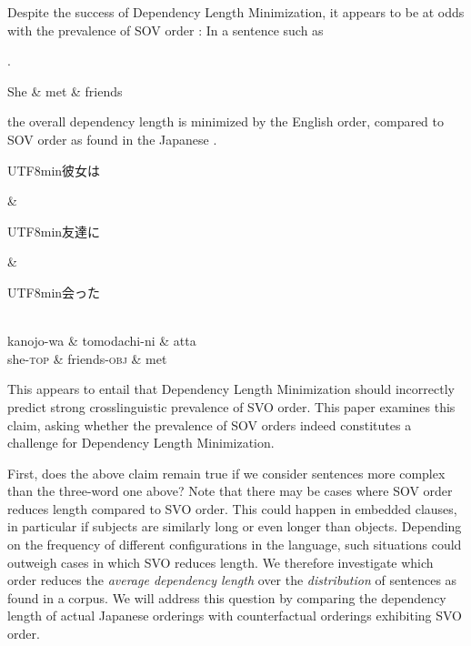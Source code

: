 \documentclass[11pt,a4paper]{article}
\newcommand{\japanese}[1]{\begin{CJK}{UTF8}{min}#1\end{CJK}}
\begin{document}
Despite the success of Dependency Length Minimization, it appears to be at odds with the prevalence of SOV order \citep{ferrer-i-cancho-placement-2017}: In a sentence such as

\ex.
\begin{dependency}[theme = simple]
   \begin{deptext}[column sep=1em]
          She \& met \& friends  \\
   \end{deptext}
\end{dependency}

the overall dependency length is minimized by the English order, compared to SOV order as found in the Japanese
\ex.
\begin{dependency}[theme = simple]
   \begin{deptext}[column sep=1em]
          \japanese{彼女は} \& \japanese{友達に} \& \japanese{会った}  \\
          kanojo-wa \& tomodachi-ni \& atta \\ 
          she-\textsc{top} \& friends-\textsc{obj} \& met \\
   \end{deptext}
\end{dependency}

This appears to entail that Dependency Length Minimization should incorrectly predict strong crosslinguistic prevalence of SVO order.
This paper examines this claim,  
asking whether the prevalence of SOV orders indeed constitutes a challenge for Dependency Length Minimization.

First, does the above claim remain true if we consider sentences more complex than the three-word one above? %
Note that there may be cases where SOV order reduces length compared to SVO order.
This could happen in embedded clauses, in particular if subjects are similarly long or even longer than objects.
Depending on the frequency of different configurations in the language, such situations could outweigh cases in which SVO reduces length.
We therefore investigate which order reduces the \emph{average dependency length} over the \emph{distribution} of sentences as found in a corpus.
We will address this question by comparing the dependency length of actual Japanese orderings with counterfactual orderings exhibiting SVO order.
\end{document}
